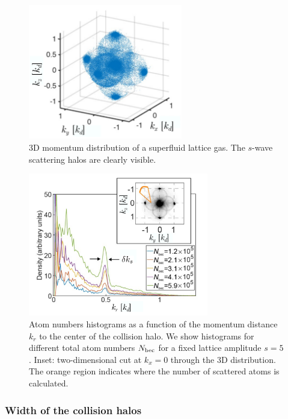 \begin{figure}
    \centering
    \includegraphics[width=0.6\textwidth]{Fig/Chapter3/spheres.png}
    \caption{3D momentum distribution of a superfluid lattice gas. The $s$-wave scattering halos are clearly visible.}
    \label{fig:spheres}
\end{figure}

\begin{figure}
    \centering
    \includegraphics[width=0.7\textwidth]{Fig/Chapter3/sphere_profiles.png}
    \caption{Atom numbers histograms as a function of the momentum distance $k_r$ to the center of the collision halo. We show histograms for different total atom numbers $N_{\rm{bec}}$ for a fixed lattice amplitude $s=5$. Inset: two-dimensional cut at $k_x=0$ through the 3D distribution. The orange region indicates where the number of scattered atoms is calculated.}
    \label{fig:sphere_profiles}
\end{figure}

\subsubsection{Width of the collision halos}

